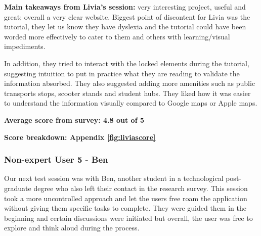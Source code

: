 \noindent\textbf{Main takeaways from Livia's session: }very interesting project,
useful and great; overall a very clear website. Biggest point of discontent for
Livia was the tutorial, they let us know they have dyslexia and the tutorial
could have been worded more effectively to cater to them and others with
learning/visual impediments.

In addition, they tried to interact with the locked elements during the
tutorial, suggesting intuition to put in practice what they are reading to
validate the information absorbed. They also suggested adding more amenities
such as public transports stops, scooter stands and student hubs. They liked how
it was easier to understand the information visually compared to Google maps or
Apple maps.

\textbf{Average score from survey: 4.8 out of 5}

\textbf{Score breakdown: Appendix \ref{fig:liviascore}}

\newpage{}

\subsubsection{Non-expert User 5 - Ben}
Our next test session was with Ben, another student in a technological
post-graduate degree who also left their contact in the research survey. This
session took a more uncontrolled approach and let the users free roam the
application without giving them specific tasks to complete. They were guided
them in the beginning and certain discussions were initiated but overall, the
user was free to explore and think aloud during the process.

